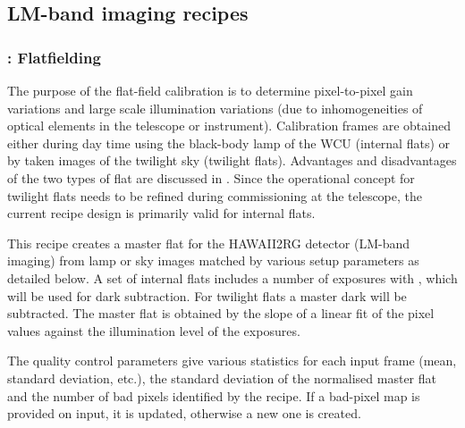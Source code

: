 
\subsection{LM-band imaging recipes}
\label{ssec:recipes_img_lm}
\subsubsection{:  Flatfielding}
\label{lm_img_flatfield}
\label{rec:lm_img_flatfield}
\label{sssec:lm_img_flatfield}
\label{metis_lm_img_flat}
\label{rec:metis_lm_img_flat}
\label{sssec:metis_lm_img_flat}

The purpose of the flat-field calibration is to determine
pixel-to-pixel gain variations and large scale illumination variations
(due to inhomogeneities of optical elements in the telescope or
instrument). Calibration frames are obtained either during day time
using the black-body lamp of the \ac{WCU} (internal flats) or by taken
images of the twilight sky (twilight flats). Advantages and
disadvantages of the two types of flat are discussed in
\cite{METIS-calibration_plan}. Since the operational concept for
twilight flats needs to be refined during commissioning at the
telescope, the current recipe design is primarily valid for internal
flats.

This recipe creates a master flat for the HAWAII2RG detector (LM-band
imaging) from lamp or sky images matched by various setup parameters
as detailed below.  A set of internal flats includes a number of
exposures with , which will be used for dark
subtraction. For twilight flats a master dark will be subtracted. The
master flat is obtained by the slope of a linear fit of the pixel
values against the illumination level of the exposures.

The quality control parameters give various statistics for each input
frame (mean, standard deviation, etc.), the standard deviation of the
normalised master flat and the number of bad pixels identified by the
recipe. If a bad-pixel map is provided on input, it is updated,
otherwise a new one is created.

